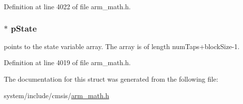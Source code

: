 Definition at line 4022 of file arm\+\_\+math.\+h.

\subsubsection[{\texorpdfstring{p\+State}{pState}}]{$\ast$ p\+State}\hypertarget{structarm__lms__instance__q15_ae29dfdb736374fcddaeaec4b7770170c}{}\label{structarm__lms__instance__q15_ae29dfdb736374fcddaeaec4b7770170c}
points to the state variable array. The array is of length num\+Taps+block\+Size-\/1. 

Definition at line 4019 of file arm\+\_\+math.\+h.



The documentation for this struct was generated from the following file\+:\begin{DoxyCompactItemize}
\item 
system/include/cmsis/\hyperlink{arm__math_8h}{arm\+\_\+math.\+h}\end{DoxyCompactItemize}
